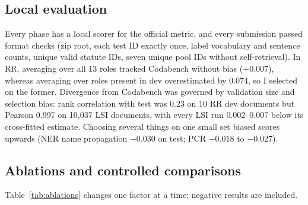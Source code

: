 \documentclass[11pt, oneside]{article}
\begin{document}
\subsection{Local evaluation}
Every phase has a local scorer for the official metric, and every submission passed format checks (zip root, each
test ID exactly once, label vocabulary and sentence counts, unique valid statute IDs, seven unique pool IDs without
self-retrieval). In RR, averaging over all 13 roles tracked Codabench without bias ($+0.007$), whereas averaging over
roles present in dev overestimated by 0.074, so I selected on the former. Divergence from Codabench was governed by
validation size and selection bias: rank correlation with test was 0.23 on 10 RR dev documents but Pearson 0.997 on
10{,}037 LSI documents, with every LSI run 0.002--0.007 below its cross-fitted estimate. Choosing several things on
one small set biased scores upwards (NER name propagation $-0.030$ on test; PCR $-0.018$ to $-0.027$).

\subsection{Ablations and controlled comparisons}
Table~\ref{tab:ablations} changes one factor at a time; negative results are included.
\end{document}
